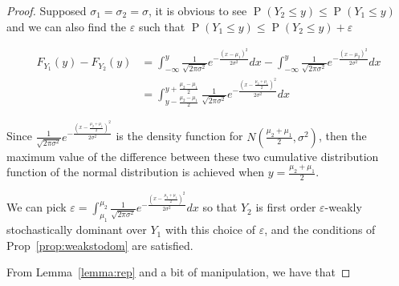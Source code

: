\documentclass[12pt]{article}
\DeclareMathOperator*{\Prob}{P}
\begin{document}
\begin{proof}
	
Supposed $\sigma_1 = \sigma_2 = \sigma$, it is obvious to see $\Prob(Y_2 \leq y) \leq \Prob(Y_1 \leq y)$ and we can also find the $\varepsilon$ such that $\Prob(Y_1 \leq y) \leq \Prob(Y_2 \leq y) + \varepsilon$

\begin{align*}
	F_{Y_1}(y) - F_{Y_2}(y) &= \int_{-\infty}^y \frac{1}{\sqrt{2\pi\sigma^2}}e^{-\frac{(x - \mu_1)^2}{2\sigma^2}}dx - \int_{-\infty}^y \frac{1}{\sqrt{2\pi\sigma^2}}e^{-\frac{(x-\mu_2)^2}{2\sigma^2}}dx\\
	&= \int_{y-\frac{\mu_2 - \mu_1}{2}}^{y+\frac{\mu_2 -\mu_1}{2}} \frac{1}{\sqrt{2\pi\sigma^2}}e^{-\frac{(x-\frac{\mu_2 + \mu_1}{2})^2}{2\sigma^2}}dx
\end{align*}

Since $\frac{1}{\sqrt{2\pi\sigma^2}}e^{-\frac{(x-\frac{\mu_2 + \mu_1}{2})^2}{2\sigma^2}}$ is the density function for $N(\frac{\mu_2 +\mu_1}{2}, \sigma^2)$, then the maximum value of the difference between these two cumulative distribution function of the normal distribution is achieved when $y = \frac{\mu_2 + \mu_1}{2}$.

We can pick $\varepsilon = \int_{\mu_1}^{\mu_2} \frac{1}{\sqrt{2\pi\sigma^2}}e^{-\frac{(x-\frac{\mu_2 + \mu_1}{2})^2}{2\sigma^2}}dx$ so that $Y_2$ is first order $\varepsilon$-weakly stochastically dominant over $Y_1$ with this choice of $\varepsilon$, and the conditions of Prop~\ref{prop:weakstodom} are satisfied.




From Lemma~\ref{lemma:rep} and a bit of manipulation, we have that 


\end{proof}
\end{document}
